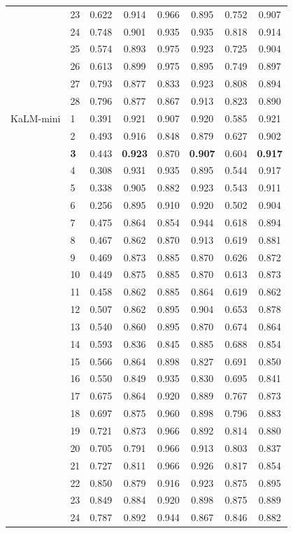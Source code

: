 \begin{longtable}{llcccccc}
 & 23 & 0.622 & 0.914 & 0.966 & 0.895 & 0.752 & 0.907 \\
 & 24 & 0.748 & 0.901 & 0.935 & 0.935 & 0.818 & 0.914 \\
 & 25 & 0.574 & 0.893 & 0.975 & 0.923 & 0.725 & 0.904 \\
 & 26 & 0.613 & 0.899 & 0.975 & 0.895 & 0.749 & 0.897 \\
 & 27 & 0.793 & 0.877 & 0.833 & 0.923 & 0.808 & 0.894 \\
 & 28 & 0.796 & 0.877 & 0.867 & 0.913 & 0.823 & 0.890 \\
\midrule
KaLM-mini & 1 & 0.391 & 0.921 & 0.907 & 0.920 & 0.585 & 0.921 \\
 & 2 & 0.493 & 0.916 & 0.848 & 0.879 & 0.627 & 0.902 \\
 & \textbf{3} & 0.443 & \textbf{0.923} & 0.870 & \textbf{0.907} & 0.604 & \textbf{0.917} \\
 & 4 & 0.308 & 0.931 & 0.935 & 0.895 & 0.544 & 0.917 \\
 & 5 & 0.338 & 0.905 & 0.882 & 0.923 & 0.543 & 0.911 \\
 & 6 & 0.256 & 0.895 & 0.910 & 0.920 & 0.502 & 0.904 \\
 & 7 & 0.475 & 0.864 & 0.854 & 0.944 & 0.618 & 0.894 \\
 & 8 & 0.467 & 0.862 & 0.870 & 0.913 & 0.619 & 0.881 \\
 & 9 & 0.469 & 0.873 & 0.885 & 0.870 & 0.626 & 0.872 \\
 & 10 & 0.449 & 0.875 & 0.885 & 0.870 & 0.613 & 0.873 \\
 & 11 & 0.458 & 0.862 & 0.885 & 0.864 & 0.619 & 0.862 \\
 & 12 & 0.507 & 0.862 & 0.895 & 0.904 & 0.653 & 0.878 \\
 & 13 & 0.540 & 0.860 & 0.895 & 0.870 & 0.674 & 0.864 \\
 & 14 & 0.593 & 0.836 & 0.845 & 0.885 & 0.688 & 0.854 \\
 & 15 & 0.566 & 0.864 & 0.898 & 0.827 & 0.691 & 0.850 \\
 & 16 & 0.550 & 0.849 & 0.935 & 0.830 & 0.695 & 0.841 \\
 & 17 & 0.675 & 0.864 & 0.920 & 0.889 & 0.767 & 0.873 \\
 & 18 & 0.697 & 0.875 & 0.960 & 0.898 & 0.796 & 0.883 \\
 & 19 & 0.721 & 0.873 & 0.966 & 0.892 & 0.814 & 0.880 \\
 & 20 & 0.705 & 0.791 & 0.966 & 0.913 & 0.803 & 0.837 \\
 & 21 & 0.727 & 0.811 & 0.966 & 0.926 & 0.817 & 0.854 \\
 & 22 & 0.850 & 0.879 & 0.916 & 0.923 & 0.875 & 0.895 \\
 & 23 & 0.849 & 0.884 & 0.920 & 0.898 & 0.875 & 0.889 \\
 & 24 & 0.787 & 0.892 & 0.944 & 0.867 & 0.846 & 0.882 \\
\end{longtable}
\endgroup
